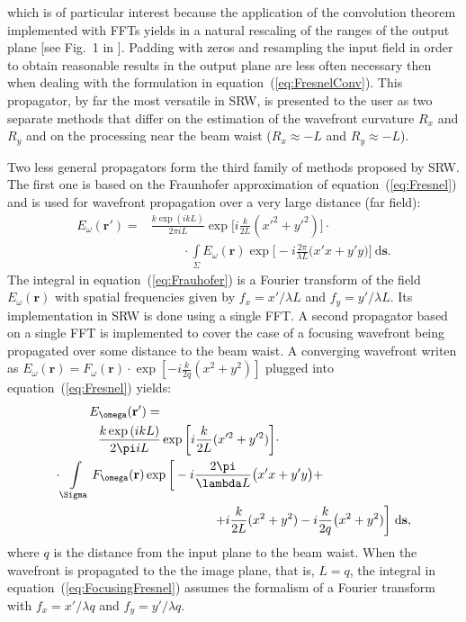 \documentclass{iucr}              %
\begin{document}
which is of particular interest because the application of the convolution theorem implemented with FFTs yields in a natural rescaling of the ranges of the output plane [see Fig.~1 in \cite{ChubarCelestre}]. Padding with zeros and resampling the input field in order to obtain reasonable results in the output plane are less often necessary then when dealing with the formulation in equation~(\ref{eq:FresnelConv}). This propagator, by far the most versatile in SRW, is presented to the user as two separate methods that differ on the estimation of the wavefront curvature $R_x$ and $R_y$ and on the processing near the beam waist ($R_x\approx-L$ and $R_y\approx-L$). 

Two less general propagators form the third family of methods proposed by SRW. The first one is based on the Fraunhofer approximation of equation~(\ref{eq:Fresnel}) and is used for wavefront propagation over a very large distance (far field):
 \begin{equation}\label{eq:Frauhofer}
\begin{split}
    E_\omega(\textbf{r}') = &\frac{k\exp{(ikL)}}{2\pi i L}\exp{\bigg[i\frac{k}{2L}(x'^2 + y'^2)\bigg]}\cdot \\
    &\enspace\qquad\cdot\int\limits_{\Sigma}{E_\omega(\textbf{r})\exp{\bigg[-i \frac{2\pi}{\lambda L}\big( x'x + y'y \big)\bigg]}~\mathrm{d}\textbf{s}}.
\end{split}
\end{equation}
The integral in equation~(\ref{eq:Frauhofer}) is a Fourier transform of the field $E_\omega(\textbf{r})$ with spatial frequencies given by $f_x=x'\big/\lambda L$ and $f_y=y'\big/\lambda L$. Its implementation in SRW is done using a single FFT. A second propagator based on a single FFT is implemented to cover the case of a focusing wavefront being propagated over some distance to the beam waist. A converging wavefront writen as $E_\omega(\textbf{r}) = F_\omega(\textbf{r})\cdot\exp{[-i\frac{k}{2q}(x^2 + y^2)]}$ plugged into equation~(\ref{eq:Fresnel}) yields:
\begin{equation}\label{eq:FocusingFresnel}
\begin{split}
E_\omega(\textbf{r}') = \qquad\qquad\qquad\qquad\qquad\qquad\qquad\qquad\qquad\qquad &\\
\frac{k\exp{(ikL)}}{2\pi i L}\exp{\bigg[i\frac{k}{2L}(x'^2 + y'^2)\bigg]}\cdot \qquad\qquad\qquad\qquad\qquad\enspace &\\
\cdot\int\limits_{\Sigma}{F_\omega(\textbf{r})\exp{\bigg[-i \frac{2\pi}{\lambda L}\big( x'x + y'y \big) +}} \qquad\qquad\qquad\quad&\\
\hfill+i\frac{k}{2L}(x^2 + y^2) - i \frac{k}{2 q}\big(x^2+y^2) \bigg]~\mathrm{d}\textbf{s},&
\end{split}
\end{equation}
where $q$ is the distance from the input plane to the beam waist. When the wavefront is propagated to the the image plane, that is, $L=q$, the integral in equation~(\ref{eq:FocusingFresnel}) assumes the formalism of a Fourier transform with $f_x=x'\big/\lambda q$ and $f_y=y'\big/\lambda q$. 
\end{document}
